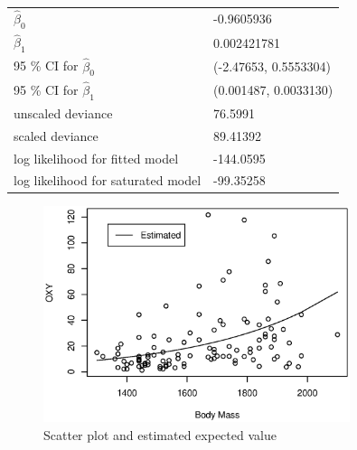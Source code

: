 \documentclass{article}
\begin{document}
\begin{enumerate}[leftmargin = 0 em, label = 3.\arabic*., font = \bfseries]
\begin{enumerate}[label = \arabic*.]
		 \begin{center}
		 \begin{tabular}{ll}
		 \toprule
		 $\hat{\beta}_0$ & -0.9605936\\
		 $\hat{\beta}_1$ & 0.002421781\\ 
		 95 \% CI for $\hat{\beta}_0$ &(-2.47653, 0.5553304)\\
		 95 \% CI for $\hat{\beta}_1$ &(0.001487, 0.0033130)\\
		 unscaled deviance & 76.5991\\
		 scaled deviance & 89.41392\\
		 log likelihood for fitted model &  -144.0595\\
		 log likelihood for saturated model &  -99.35258\\
		 \bottomrule
		 \end{tabular}
		 \end{center}
		 \begin{figure}[!htb]
		 	\centering
		 	\includegraphics[width =  0.8\textwidth]{estimates.eps}
		 	\caption{Scatter plot and estimated expected value}
		 	\label{estimated}
		 \end{figure}
		 




	\end{enumerate}
	

\end{enumerate}
\end{document}
